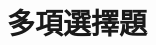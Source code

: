 \documentclass[class=exam, crop=false]{standalone}
\begin{document}
% 






\section*{多項選擇題}
\begin{questions}
    \ansdisplay
    \foreachproblem[mc]{
        \filbreak\question \thisproblem
    }
\end{questions}
\end{document}
